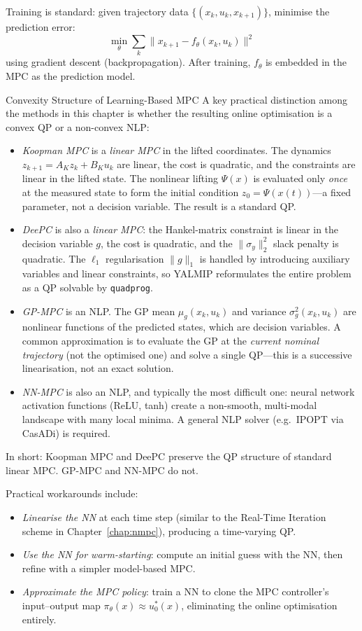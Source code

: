 Training is standard: given trajectory data $\{(x_k, u_k, x_{k+1})\}$, minimise the prediction error:
\[
\min_\theta \sum_{k} \|x_{k+1} - f_\theta(x_k, u_k)\|^2
\]
using gradient descent (backpropagation). After training, $f_\theta$ is embedded in the MPC as the prediction model.

\begin{alertbox}{Convexity Structure of Learning-Based MPC}
	A key practical distinction among the methods in this chapter is whether the resulting online optimisation is a convex QP or a non-convex NLP:
	\begin{itemize}[noitemsep]
		\item \emph{Koopman MPC} is a \emph{linear MPC} in the lifted coordinates. The dynamics $z_{k+1} = A_K z_k + B_K u_k$ are linear, the cost is quadratic, and the constraints are linear in the lifted state. The nonlinear lifting $\Psi(x)$ is evaluated only \emph{once} at the measured state to form the initial condition $z_0 = \Psi(x(t))$---a fixed parameter, not a decision variable. The result is a standard QP.
		\item \emph{DeePC} is also a \emph{linear MPC}: the Hankel-matrix constraint is linear in the decision variable $g$, the cost is quadratic, and the $\|\sigma_y\|_2^2$ slack penalty is quadratic. The $\ell_1$ regularisation $\|g\|_1$ is handled by introducing auxiliary variables and linear constraints, so YALMIP reformulates the entire problem as a QP solvable by \texttt{quadprog}.
		\item \emph{GP-MPC} is an NLP. The GP mean $\mu_g(x_k, u_k)$ and variance $\sigma_g^2(x_k, u_k)$ are nonlinear functions of the predicted states, which are decision variables. A common approximation is to evaluate the GP at the \emph{current nominal trajectory} (not the optimised one) and solve a single QP---this is a successive linearisation, not an exact solution.
		\item \emph{NN-MPC} is also an NLP, and typically the most difficult one: neural network activation functions (ReLU, tanh) create a non-smooth, multi-modal landscape with many local minima. A general NLP solver (e.g.\ IPOPT via CasADi) is required.
	\end{itemize}
	In short: Koopman MPC and DeePC preserve the QP structure of standard linear MPC. GP-MPC and NN-MPC do not.
\end{alertbox}

Practical workarounds include:
\begin{itemize}
	\item \emph{Linearise the NN} at each time step (similar to the Real-Time Iteration scheme in Chapter~\ref{chap:nmpc}), producing a time-varying QP.
	\item \emph{Use the NN for warm-starting}: compute an initial guess with the NN, then refine with a simpler model-based MPC.
	\item \emph{Approximate the MPC policy}: train a NN to clone the MPC controller's input--output map $\pi_\theta(x) \approx u_0^*(x)$, eliminating the online optimisation entirely.
\end{itemize}

